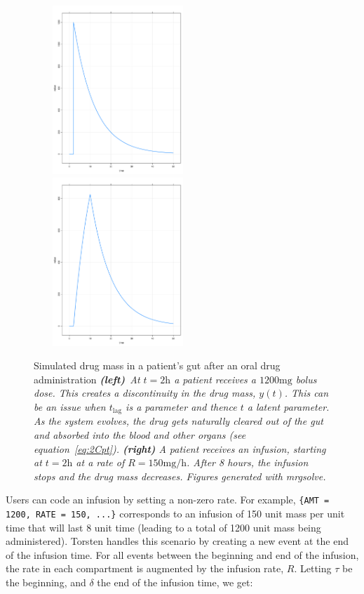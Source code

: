 \documentclass[11pt]{amsart}
\begin{document}
\begin{figure}[!htb]
\begin{center}
\includegraphics[width = 2.5in, height = 2.5in, trim=0in 0in 0 0in]{graphics/BolusDose.pdf}
\includegraphics[width = 2.5in, height = 2.5in, trim=0in 0in 0 0in]{graphics/Infusion.pdf}
\caption{Simulated drug mass in a patient's gut after an oral drug administration 
\textit{\hbox{\textbf{(left)} At} $t = 2 \mathrm{h}$ a patient receives a $1200 \mathrm{mg}$
bolus dose. This creates a discontinuity in the drug mass, $y(t)$. This can be an issue
when $t_\mathrm{lag}$ is a parameter and thence $t$ a latent parameter. As the system evolves, 
the drug gets naturally cleared out of the gut and absorbed into the blood and other organs (see 
equation~\ref{eq:2Cpt}).  \textbf{(right)} A patient receives an infusion, starting at $t = 2\mathrm{h}$
at a rate of $R = 150\mathrm{mg/h}$. After 8 hours, the infusion stops and the drug mass decreases.
Figures generated with mrgsolve.}} 
\label{fig:bolus}
\end{center}
\end{figure}

Users can code an infusion by setting a non-zero rate. For example, 
\hbox{\texttt{\{AMT = 1200, RATE = 150, ...\}}} corresponds to an infusion of 150 unit mass per unit
time that will last 8 unit time (leading to a total of 1200 unit mass being administered). Torsten handles
this scenario by creating a new event at the end of the infusion time. For all events between the
beginning and end of the infusion, the rate in each compartment is augmented by the infusion rate,
$R$. Letting $\tau$ be the beginning, and $\delta$ the end of the infusion time, we get:
\end{document}
